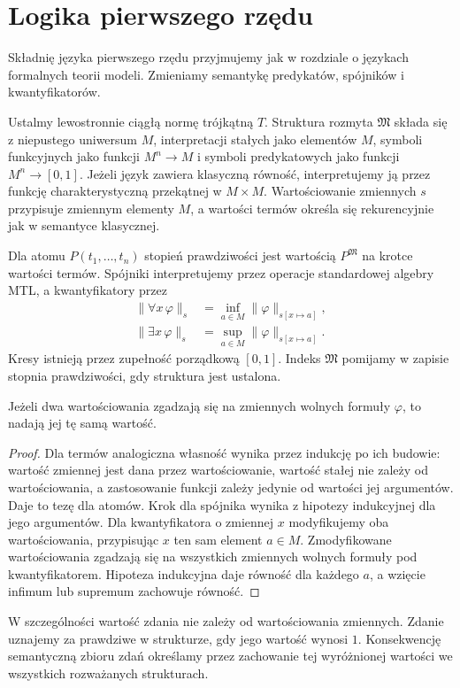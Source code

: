 \section{Logika pierwszego rzędu}
Składnię języka pierwszego rzędu przyjmujemy jak w rozdziale
o językach formalnych teorii modeli. Zmieniamy semantykę
predykatów, spójników i kwantyfikatorów.

\begin{definicja}\label{def:lst-fuzzy-structure}
Ustalmy lewostronnie ciągłą normę trójkątną $T$.
Struktura rozmyta $\mathfrak M$ składa się z niepustego
uniwersum $M$, interpretacji stałych jako elementów $M$,
symboli funkcyjnych jako funkcji $M^n\to M$ i symboli
predykatowych jako funkcji $M^n\to[0,1]$.
Jeżeli język zawiera klasyczną równość, interpretujemy ją
przez funkcję charakterystyczną przekątnej w $M\times M$.
Wartościowanie zmiennych $s$ przypisuje zmiennym elementy
$M$, a wartości termów określa się rekurencyjnie jak
w semantyce klasycznej.
\end{definicja}
Dla atomu $P(t_1,\ldots,t_n)$ stopień prawdziwości jest
wartością $P^{\mathfrak M}$ na krotce wartości termów.
Spójniki interpretujemy przez operacje standardowej algebry
MTL, a kwantyfikatory przez
\[
\begin{split}
 \|\forall x\,\varphi\|_s
 &=\inf_{a\in M}\|\varphi\|_{s[x\mapsto a]},\\
 \|\exists x\,\varphi\|_s
 &=\sup_{a\in M}\|\varphi\|_{s[x\mapsto a]}.
\end{split}
\]
Kresy istnieją przez zupełność porządkową $[0,1]$.
Indeks $\mathfrak M$ pomijamy w zapisie stopnia prawdziwości,
gdy struktura jest ustalona.

\begin{lemat}
\label{lem:lst-fuzzy-free-variables}
Jeżeli dwa wartościowania zgadzają się na zmiennych wolnych
formuły $\varphi$, to nadają jej tę samą wartość.
\end{lemat}
\begin{proof}
Dla termów analogiczna własność wynika przez indukcję
po ich budowie: wartość zmiennej jest dana przez wartościowanie,
wartość stałej nie zależy od wartościowania, a zastosowanie
funkcji zależy jedynie od wartości jej argumentów.
Daje to tezę dla atomów. Krok dla spójnika wynika z hipotezy
indukcyjnej dla jego argumentów. Dla kwantyfikatora o zmiennej
$x$ modyfikujemy oba wartościowania, przypisując $x$ ten sam
element $a\in M$. Zmodyfikowane wartościowania zgadzają się
na wszystkich zmiennych wolnych formuły pod kwantyfikatorem.
Hipoteza indukcyjna daje równość dla każdego $a$, a wzięcie
infimum lub supremum zachowuje równość.
\end{proof}
W szczególności wartość zdania nie zależy od wartościowania
zmiennych. Zdanie uznajemy za prawdziwe w strukturze, gdy
jego wartość wynosi $1$. Konsekwencję semantyczną zbioru zdań
określamy przez zachowanie tej wyróżnionej wartości
we wszystkich rozważanych strukturach.

